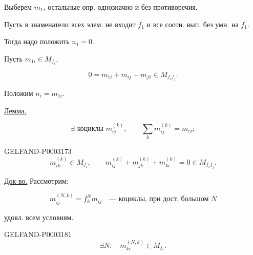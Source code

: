 Выберем $m_1$, остальные опр. однозначно и без противоречия.

Пусть в знаменатели всех элем. не входит $f_1$ и все соотн. вып. без умн. на $f_1$.

Тогда надо положить $n_1=0$.

Пусть $m_{1i}\in M_{f_i}$,

\begin{equation*}0=m_{1i}+m_{ij}+m_{j1}\in M_{f_i f_j}.\end{equation*}

Положим $n_i=m_{1i}$.

\uline{Лемма.}

\begin{equation*}\exists\text{ коциклы }m_{ij}^{(k)},\qquad\sum_k m_{ij}^{(k)}=m_{ij};\end{equation*}

\begin{GelfandAdjacentEvidence}{GELFAND-P000317}{3}
\begin{equation*}m_{ik}^{(k)}\in M_{f_i},\qquad m_{ij}^{(k)}+m_{jk}^{(k)}+m_{ki}^{(k)}=0\in M_{f_i f_j}.\end{equation*}

\end{GelfandAdjacentEvidence}


\uline{Док-во.} Рассмотрим:

\begin{equation*}m_{ij}^{(N,k)}=f_k^N m_{ij}\quad\text{--- }\underline{\text{коциклы}}\text{, при дост. большом }N\end{equation*}



удовл. всем условиям.

\begin{GelfandAdjacentEvidence}{GELFAND-P000318}{1}
\begin{equation*}\exists N:\quad m_{ki}^{(N,k)}\in M_{f_i}.\end{equation*}

\end{GelfandAdjacentEvidence}


